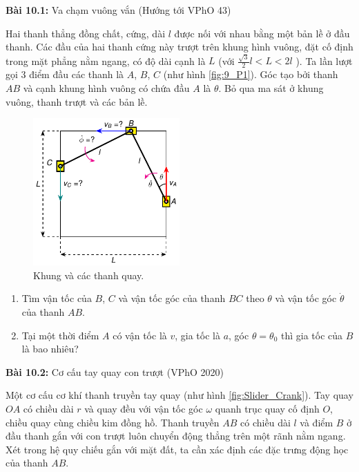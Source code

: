 \textbf{Bài 10.1:} Va chạm vuông vắn (Hướng tới VPhO 43)

Hai thanh thẳng đồng chất, cứng, dài \(l\) được nối với nhau bằng một bản lề ở đầu thanh. 
Các đầu của hai thanh cứng này trượt trên khung hình vuông, đặt cố định trong mặt phẳng nằm ngang, có độ dài cạnh là \(L\) (với \(\frac{\sqrt{3}}{2}l<L<2l\) ). 
Ta lần lượt gọi 3 điểm đầu các thanh là \(A\), \(B\), \(C\) (như hình \ref{fig:9_P1}). Góc tạo bởi thanh \(AB\) và cạnh khung hình vuông có chứa đầu \(A\) là \(\theta\). Bỏ qua ma sát ở khung vuông, thanh trượt và các bản lề.

\begin{figure}[!h]
    \centering
    \includegraphics[width=0.5\textwidth]{Tuan10/Figures/Square_collision/Square_Collision.pdf}
    \caption{Khung và các thanh quay.}
    \label{fig:Square_collision}
\end{figure}

\begin{enumerate}
    \item Tìm vận tốc của \(B\), \(C\) và vận tốc góc của thanh \(BC\) theo \(\theta\) và vận tốc góc \(\dot{\theta}\) của thanh \(AB\).
    \item Tại một thời điểm \(A\) có vận tốc là \(v\), gia tốc là \(a\), góc \(\theta=\theta_0\) thì gia tốc của \(B\) là bao nhiêu?
\end{enumerate}

\textbf{Bài 10.2:} Cơ cấu tay quay con trượt (VPhO 2020)

Một cơ cấu cơ khí thanh truyền tay quay (như hình \ref{fig:Slider_Crank}). 
Tay quay \(OA\) có chiều dài \(r\) và quay đều với vận tốc góc \(\omega\) quanh trục quay cố định \(O\), chiều quay cùng chiều kim đồng hồ. 
Thanh truyền \(AB\) có chiều dài \(l\) và điểm \(B\) ở đầu thanh gắn với con trượt luôn chuyển động thẳng trên một rãnh nằm ngang. 
Xét trong hệ quy chiếu gắn với mặt đất, ta cần xác định các đặc trưng động học của thanh \(AB\).


